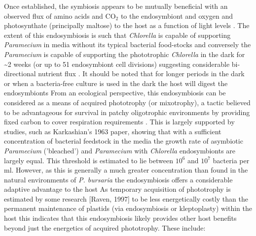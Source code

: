 Once established, the symbiosis appears to be mutually beneficial with an observed flux of amino acids and CO$_{2}$ to the endosymbiont and oxygen and photosynthate (principally maltose) to the host as a function of light levels \citep{Karakashian1963}.
The extent of this endosymbiosis is such that \textit{Chlorella} is capable of supporting \textit{Paramecium} in media without its typical bacterial food-stocks and conversely the \textit{Paramecium} is capable of supporting the phototrophic \textit{Chlorella} in the dark for \textasciitilde 2 weeks (or up to 51 endosymbiont cell divisions) suggesting considerable bi-directional nutrient flux \citep{Siegel1960,Karakashian1963}.
It should be noted that for longer periods in the dark or when a bacteria-free culture is used in the dark the host will digest the endosymbionts \citep{Parker1926}
From an ecological perspective, this endosymbiosis can be considered as a means of acquired phototrophy (or mixotrophy), a tactic believed to be advantageous for survival in patchy oligotrophic environments by providing fixed carbon to cover respiration requirements \citep{Putt1990}.
This is largely supported by studies, such as Karkashian's 1963 paper, showing that with a sufficient concentration of bacterial feedstock in the media the growth rate of asymbiotic \textit{Paramecium} ('bleached') and \textit{Paramecium} with \textit{Chlorella} endosymbionts are largely equal.
This threshold is estimated to lie between $10^{6}$ and $10^{7}$ bacteria per ml.  
However, as this is generally a much greater concentration than found in the natural environments of \textit{P. bursaria} the endosymbiosis offers a considerable adaptive advantage to the host \citep{Karakashian1963}
As temporary acquisition of phototrophy is estimated by some research [Raven, 1997] to be less energetically costly than the permanent maintenance of plastids (via endosymbiosis or kleptoplasty) within the host this indicates that this endosymbiosis likely provides other host benefits beyond just the energetics of acquired phototrophy. These include: 
